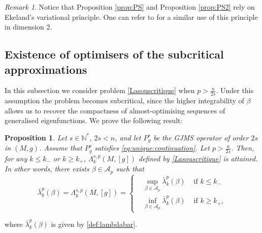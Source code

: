 \documentclass[10pt]{amsart}
\numberwithin{equation}{section}
\def\La{{\Lambda}}
\def\be{{\beta}}
\theoremstyle{plain}
\newtheorem{prop}[theo]{Proposition}%
\theoremstyle{remark}
\newtheorem{rem}{Remark}[section]
\begin{document}
\begin{rem}
Notice that Proposition \ref{prop:PS} and Proposition \ref{prop:PS2} rely on Ekeland's variational principle. One can refer to \cite{Petrides5, Petrides4} for a similar use of this principle in dimension 2. 
\end{rem}



\subsection{Existence of optimisers of the subcritical approximations}

In this subsection we consider problem \eqref{Lasouscritique} when $p > \frac{n}{2s}$. Under this assumption the problem becomes subcritical, since the higher integrability of $\beta$ allows us to recover the compactness of almost-optimising sequences of generalised eigenfunctions. We prove the following result:


\begin{prop}\label{subcritical_theorem}
Let $s \in \mathbb{N}^*$, $2s <n$, and let $P_g^s$ be the GJMS operator of order $2s$ in $(M,g)$. Assume that $P_g^s$ satisfies \eqref{eq:unique:continuation}. Let  $p>\frac{n}{2s}$. Then, for any $k \le k_{-}$ or $k \ge k_{+}$,  $\La_k^{s,p}(M,[g])$ defined by \eqref{Lasouscritique} is attained. In other words, there exists $\beta \in \mathcal{A}_p$ such that 
 \begin{equation*} %
\bar{\lambda}_k^p(\beta) = \La_k^{s,p}(M,[g]) =  \left \{
\begin{aligned}
& \sup_{\be \in \mathcal{A}_p}  \bar{\lambda}_k^p(\beta) & \text{ if } k \le k_{-} \\
& \inf_{\be \in \mathcal{A}_p}  \bar{\lambda}_k^p(\beta) & \text{ if } k \ge k_{+},
\end{aligned} \right. 
\end{equation*}
\end{prop}
where $\bar{\lambda}_k^p(\beta)$ is given by \eqref{def:lambdabar}.
\end{document}
